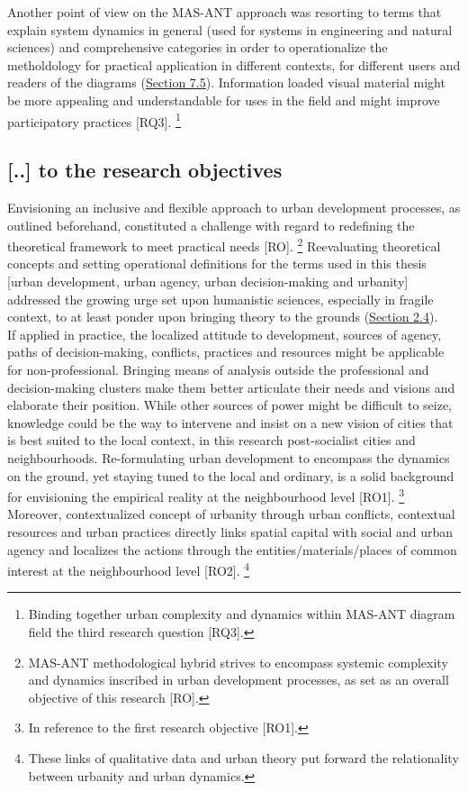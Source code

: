 \documentclass[11pt]{report}
\begin{document}
{{{Another point of view on the MAS-ANT approach was resorting to terms that explain system dynamics in general (used for systems in engineering and natural sciences) and comprehensive categories in order to operationalize the metholdology for practical application in different contexts, for different users and readers of the diagrams (\href{Section 7.5}{Section 7.5}).
Information loaded visual material might be more appealing and understandable for uses in the field and might improve participatory practices [RQ3].
\footnote{Binding together urban complexity and dynamics within MAS-ANT diagram field the third research question [RQ3].}

\subsection{[..] to the research objectives}

Envisioning an inclusive and flexible approach to  urban development processes, as outlined beforehand, constituted a challenge with regard to redefining the theoretical framework to meet practical needs [RO].
\footnote{MAS-ANT methodological hybrid strives to encompass  systemic complexity and dynamics inscribed in urban development processes, as set as an overall objective of this research [RO].}
Reevaluating theoretical concepts and setting operational definitions for the terms used in this thesis [urban development, urban agency, urban decision-making and urbanity] addressed the growing urge set upon humanistic sciences, especially in fragile context, to at least ponder upon bringing theory to the grounds (\href{Section 2.4}{Section 2.4}).
\\

If applied in practice, the localized attitude to  development, sources of agency, paths of decision-making, conflicts, practices and resources might be applicable for non-professional. 
Bringing means of analysis outside the professional and decision-making clusters make them better articulate their needs and visions and elaborate their position.
While other sources of power might be difficult to seize, knowledge could be the way to intervene and insist on a new vision of cities that is best suited to the local context, in this research post-socialist cities and neighbourhoods.
Re-formulating urban development to encompass the dynamics on the ground, yet staying tuned to the local and ordinary, is a solid background for envisioning the empirical reality at the neighbourhood level [RO1].
\footnote{In reference to the first research objective [RO1].}
Moreover, contextualized concept of urbanity through urban conflicts, contextual resources and urban practices directly links spatial capital with social and urban agency and localizes the actions through the entities/materials/places of common interest at the neighbourhood level [RO2].
\footnote{These links of qualitative data and urban theory put forward the relationality between urbanity and urban dynamics.}
\\

}}}
\end{document}
